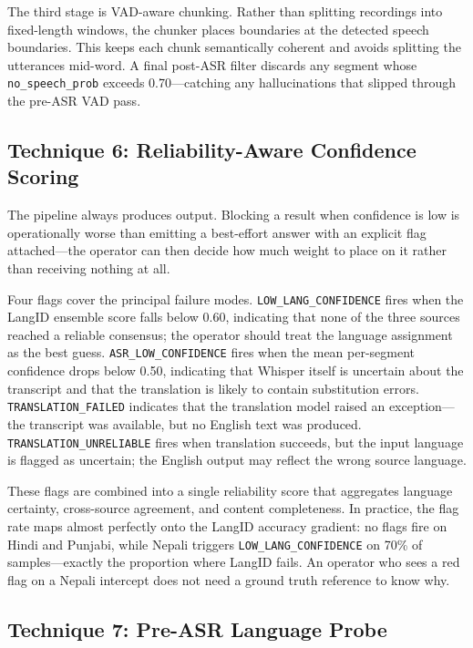 \documentclass[12pt, onecolumn]{IEEEtran}
\begin{document}
The third stage is VAD-aware chunking. Rather than splitting recordings into fixed-length windows, the chunker places boundaries at the detected speech boundaries. This keeps each chunk semantically coherent and avoids splitting the utterances mid-word. A final post-ASR filter discards any segment whose \texttt{no\_speech\_prob} exceeds 0.70---catching any hallucinations that slipped through the pre-ASR VAD pass.

\subsection{Technique 6: Reliability-Aware Confidence Scoring}
\label{sec:reliability}

The pipeline always produces output. Blocking a result when confidence is low is operationally worse than emitting a best-effort answer with an explicit flag attached---the operator can then decide how much weight to place on it rather than receiving nothing at all.

Four flags cover the principal failure modes. \texttt{LOW\_LANG\_CONFIDENCE} fires when the LangID ensemble score falls below 0.60, indicating that none of the three sources reached a reliable consensus; the operator should treat the language assignment as the best guess. \texttt{ASR\_LOW\_CONFIDENCE} fires when the mean per-segment confidence drops below 0.50, indicating that Whisper itself is uncertain about the transcript and that the translation is likely to contain substitution errors. \texttt{TRANSLATION\_FAILED} indicates that the translation model raised an exception---the transcript was available, but no English text was produced. \texttt{TRANSLATION\_UNRELIABLE} fires when translation succeeds, but the input language is flagged as uncertain; the English output may reflect the wrong source language.

These flags are combined into a single reliability score that aggregates language certainty, cross-source agreement, and content completeness. In practice, the flag rate maps almost perfectly onto the LangID accuracy gradient: no flags fire on Hindi and Punjabi, while Nepali triggers \texttt{LOW\_LANG\_CONFIDENCE} on 70\% of samples---exactly the proportion where LangID fails. An operator who sees a red flag on a Nepali intercept does not need a ground truth reference to know why.

\subsection{Technique 7: Pre-ASR Language Probe}
\label{sec:probe}
\end{document}
